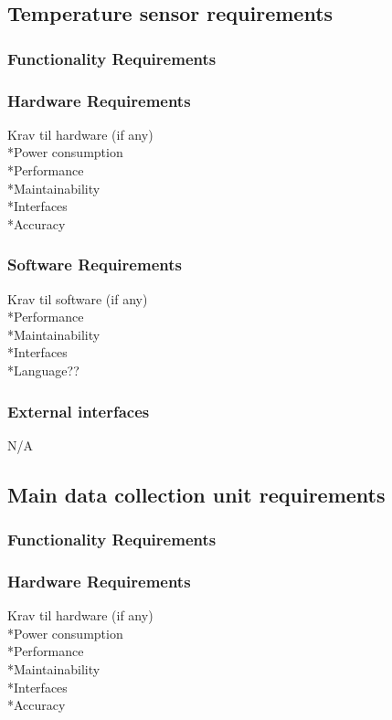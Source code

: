 \subsection{Temperature sensor requirements}

\subsubsection{Functionality Requirements}

\subsubsection{Hardware Requirements}
Krav til hardware (if any)\\
*Power consumption\\
*Performance\\
*Maintainability\\
*Interfaces\\
*Accuracy\\
\subsubsection{Software Requirements}
Krav til software (if any)\\
*Performance\\
*Maintainability\\
*Interfaces\\
*Language??\\

\subsubsection{External interfaces}
N/A
\subsection{Main data collection unit requirements}

\subsubsection{Functionality Requirements}

\subsubsection{Hardware Requirements}
Krav til hardware (if any)\\
*Power consumption\\
*Performance\\
*Maintainability\\
*Interfaces\\
*Accuracy\\

